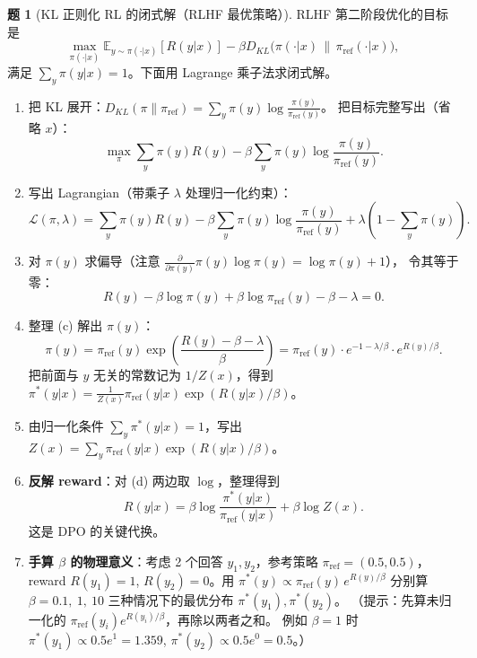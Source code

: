 \documentclass[11pt,a4paper]{article}
\theoremstyle{definition}
\newtheorem{problem}{题}
\begin{document}
\medskip

\begin{problem}[KL 正则化 RL 的闭式解（RLHF 最优策略）]
RLHF 第二阶段优化的目标是
\[
\max_{\pi(\cdot|x)} \mathbb{E}_{y \sim \pi(\cdot|x)}[R(y|x)] - \beta D_{KL}\!\big(\pi(\cdot|x)\,\big\|\,\pi_{\mathrm{ref}}(\cdot|x)\big),
\]
满足 $\sum_y \pi(y|x) = 1$。下面用 Lagrange 乘子法求闭式解。

\begin{enumerate}[label=(\alph*)]
    \item 把 KL 展开：$D_{KL}(\pi \| \pi_{\mathrm{ref}}) = \sum_y \pi(y) \log \frac{\pi(y)}{\pi_{\mathrm{ref}}(y)}$。
    把目标完整写出（省略 $x$）：
    \[
    \max_\pi \sum_y \pi(y) R(y) - \beta \sum_y \pi(y) \log \frac{\pi(y)}{\pi_{\mathrm{ref}}(y)}.
    \]
    \item 写出 Lagrangian（带乘子 $\lambda$ 处理归一化约束）：
    \[
    \mathcal{L}(\pi, \lambda) = \sum_y \pi(y) R(y) - \beta \sum_y \pi(y) \log \frac{\pi(y)}{\pi_{\mathrm{ref}}(y)} + \lambda\!\left(1 - \sum_y \pi(y)\right).
    \]
    \item 对 $\pi(y)$ 求偏导（注意 $\frac{\partial}{\partial \pi(y)} \pi(y) \log \pi(y) = \log \pi(y) + 1$），
    令其等于零：
    \[
    R(y) - \beta \log \pi(y) + \beta \log \pi_{\mathrm{ref}}(y) - \beta - \lambda = 0.
    \]
    \item 整理 (c) 解出 $\pi(y)$：
    \[
    \pi(y) = \pi_{\mathrm{ref}}(y) \exp\!\left(\frac{R(y) - \beta - \lambda}{\beta}\right)
    = \pi_{\mathrm{ref}}(y) \cdot e^{-1 - \lambda/\beta} \cdot e^{R(y)/\beta}.
    \]
    把前面与 $y$ 无关的常数记为 $1/Z(x)$，得到
    $\pi^*(y|x) = \frac{1}{Z(x)} \pi_{\mathrm{ref}}(y|x) \exp(R(y|x)/\beta)$。
    \item 由归一化条件 $\sum_y \pi^*(y|x) = 1$，写出 $Z(x) = \sum_y \pi_{\mathrm{ref}}(y|x) \exp(R(y|x)/\beta)$。
    \item \textbf{反解 reward}：对 (d) 两边取 $\log$，整理得到
    \[
    R(y|x) = \beta \log \frac{\pi^*(y|x)}{\pi_{\mathrm{ref}}(y|x)} + \beta \log Z(x).
    \]
    这是 DPO 的关键代换。
    \item \textbf{手算 $\beta$ 的物理意义}：考虑 2 个回答 $y_1, y_2$，参考策略 $\pi_{\mathrm{ref}} = (0.5, 0.5)$，
    reward $R(y_1) = 1$, $R(y_2) = 0$。用 $\pi^*(y) \propto \pi_{\mathrm{ref}}(y)\, e^{R(y)/\beta}$
    分别算 $\beta = 0.1,\ 1,\ 10$ 三种情况下的最优分布 $\pi^*(y_1), \pi^*(y_2)$。
    （提示：先算未归一化的 $\pi_{\mathrm{ref}}(y_i) e^{R(y_i)/\beta}$，再除以两者之和。
    例如 $\beta = 1$ 时 $\pi^*(y_1) \propto 0.5 e^{1} = 1.359$, $\pi^*(y_2) \propto 0.5 e^{0} = 0.5$。）

\end{enumerate}
\end{problem}
\end{document}
